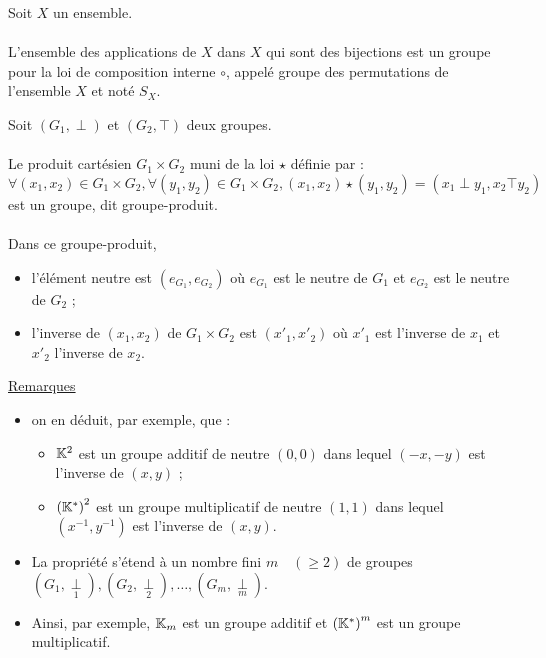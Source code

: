 \begin{defprop}
    Soit \(X\) un ensemble.\\~\\
    L’ensemble des applications de \(X\) dans \(X\) qui sont des bijections est un groupe pour la loi de composition interne \(\circ\), appelé groupe des permutations de l’ensemble \(X\) et noté \(S_X\).
\end{defprop}
\begin{defprop}
    Soit \((G_1, \perp)\) et \((G_2, \top)\) deux groupes.\\~\\
    Le produit cartésien \(G_1 \times G_2\) muni de la loi \(\star\) définie par :
    \[\forall(x_1, x_2) \in G_1 \times G_2, \forall(y_1, y_2) \in G_1 \times G_2, (x_1, x_2) \star (y_1, y_2) = (x_1 \perp y_1, x_2\top y_2)\]
    est un groupe, dit groupe-produit.\\~\\
    Dans ce groupe-produit,
    \begin{itemize}
        \item l’élément neutre est \((e_{G_1},e_{G_2} )\) où \(e_{G_1}\) est le neutre de \(G_1\) et \(e_{G_2}\) est le neutre de \(G_2\) ;
        \item l’inverse de \((x_1, x_2)\) de \(G_1 \times G_2\) est \((x'_1, x'_2)\) où \(x'_1\) est l’inverse de \(x_1\) et \(x'_2\) l’inverse de \(x_2\).
    \end{itemize}
    \underline{Remarques}
    \begin{itemize}
        \item on en déduit, par exemple, que :
        \begin{itemize}
            \item \(\mathbb{K}^2\) est un groupe additif de neutre \((0, 0)\) dans lequel \((-x, -y)\) est l’inverse de \((x, y)\) ;
            \item \(\left(\mathbb{K}^*\right)^2\) est un groupe multiplicatif de neutre \((1, 1)\) dans lequel \((x^{-1}, y^{-1})\) est l’inverse de \((x, y)\).
        \end{itemize}
        \item La propriété s’étend à un nombre fini \(m \quad(\geq 2)\) de groupes \((G_1, \underset{1}{\perp} ),(G_2, \underset{2}{\perp} ), \dots , (G_m, \underset{m}{\perp} )\).
        \item Ainsi, par exemple, \(\mathbb{K}_m\) est un groupe additif et \(\left(\mathbb{K}^*\right)^m\) est un groupe multiplicatif.
    \end{itemize}
\end{defprop}

